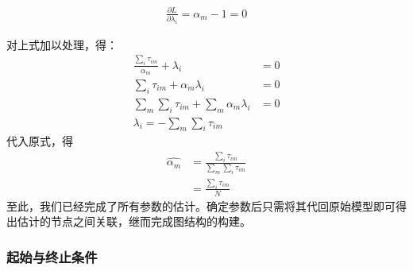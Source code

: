 \begin{equation}\begin{aligned}
\frac{\partial L}{\partial \lambda_i}=\alpha_{m}-1=0
\end{aligned}\end{equation}

对上式加以处理，得：
\begin{equation}\begin{aligned}
\frac{\sum_i\tau_{im}}{\alpha_m}+\lambda_i&=0\\
\sum_i\tau_{im}+\alpha_m\lambda_i&=0\\
\sum_m\sum_i\tau_{im}+\sum_m\alpha_m\lambda_i&=0\\
\lambda_i=-\sum_m\sum_i\tau_{im}
\end{aligned}\end{equation}
代入原式，得
\begin{equation}\begin{aligned}
\hat{\alpha_m}&=\frac{\sum_i\tau_{im}}{\sum_m\sum_i\tau_{im}}\\
&=\frac{\sum_i\tau_{im}}{N}
\end{aligned}\end{equation}
至此，我们已经完成了所有参数的估计。确定参数后只需将其代回原始模型即可得出估计的节点之间关联，继而完成图结构的构建。

\subsubsection{起始与终止条件}

